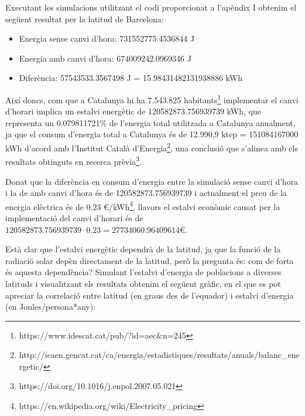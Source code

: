 \documentclass{article}
\begin{document}
Executant les simulacions utilitzant el codi proporcionat a l'apèndix I obtenim el següent resultat per la latitud de Barcelona:
\begin{itemize}
    \item Energia sense canvi d'hora: 731552775.4536844 J
    \item Energia amb canvi d'hora: 674009242.0969346 J
    \item Diferència: 57543533.3567498 J = 15.98431482131938886 kWh
\end{itemize}

Així doncs, com que a Catalunya hi ha 7.543.825 habitants\footnote{https://www.idescat.cat/pub/?id=aec\&n=245} implementar el canvi d'horari implica un estalvi energètic de 120582873.756939739 kWh, que representa un 0.079811721\% de l'energia total utilitzada a Catalunya anualment, ja que el consum d'energia total a Catalunya és de 12.990,9 ktep = 151084167000 kWh d'acord amb l'Institut Català d'Energia\footnote{http://icaen.gencat.cat/ca/energia/estadistiques/resultats/anuals/balanc\_energetic/}, una conclusió que s'alinea amb els resultats obtinguts en recerca prèvia\footnote{https://doi.org/10.1016/j.enpol.2007.05.021}.


Donat que la diferència en consum d'energia entre la simulació sense canvi d'hora i la de amb canvi d'hora és de 120582873.756939739 i actualment el preu de la energia elèctrica és de 0.23 €/kWh\footnote{https://en.wikipedia.org/wiki/Electricity\_pricing}, llavors el estalvi econòmic causat per la implementació del canvi d'horari és de $120582873.756939739\cdot 0.23=27734060.96409614$€.

Està clar que l'estalvi energètic dependrà de la latitud, ja que la funció de la radiació solar depèn directament de la latitud, però la pregunta és: com de forta és aquesta dependència?
Simulant l'estalvi d'energia de poblacions a diverses latituds i visualitzant els resultats obtenim el següent gràfic, en el que es pot apreciar la correlació entre latitud (en graus des de l'equador) i estalvi d'energia (en Joules/persona*any):
\end{document}
